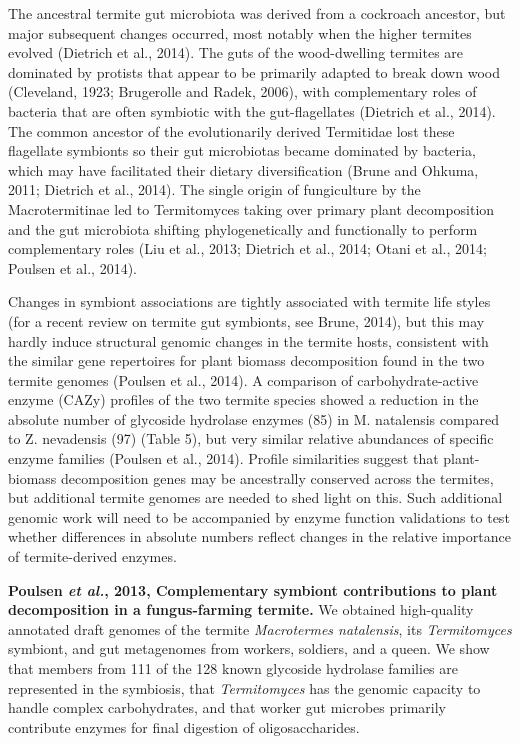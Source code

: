 \documentclass[11pt]{article}
\begin{document}
\begin{sloppypar}
\par
The ancestral termite gut microbiota was derived from a cockroach ancestor, but major subsequent changes occurred, most notably when the higher termites evolved (Dietrich et al., 2014). The guts of the wood-dwelling termites are dominated by protists that appear to be primarily adapted to break down wood (Cleveland, 1923; Brugerolle and Radek, 2006), with complementary roles of bacteria that are often symbiotic with the gut-flagellates (Dietrich et al., 2014). The common ancestor of the evolutionarily derived Termitidae lost these flagellate symbionts so their gut microbiotas became dominated by bacteria, which may have facilitated their dietary diversification (Brune and Ohkuma, 2011; Dietrich et al., 2014). The single origin of fungiculture by the Macrotermitinae led to Termitomyces taking over primary plant decomposition and the gut microbiota shifting phylogenetically and functionally to perform complementary roles (Liu et al., 2013; Dietrich et al., 2014; Otani et al., 2014; Poulsen et al., 2014).
\par
Changes in symbiont associations are tightly associated with termite life styles (for a recent review on termite gut symbionts, see Brune, 2014), but this may hardly induce structural genomic changes in the termite hosts, consistent with the similar gene repertoires for plant biomass decomposition found in the two termite genomes (Poulsen et al., 2014). A comparison of carbohydrate-active enzyme (CAZy) profiles of the two termite species showed a reduction in the absolute number of glycoside hydrolase enzymes (85) in M. natalensis compared to Z. nevadensis (97) (Table 5), but very similar relative abundances of specific enzyme families (Poulsen et al., 2014). Profile similarities suggest that plant-biomass decomposition genes may be ancestrally conserved across the termites, but additional termite genomes are needed to shed light on this. Such additional genomic work will need to be accompanied by enzyme function validations to test whether differences in absolute numbers reflect changes in the relative importance of termite-derived enzymes.
\par
\textbf{Poulsen \textit{et al.}, 2013, Complementary symbiont contributions to plant decomposition in a fungus-farming termite.} \newline
We obtained high-quality annotated draft genomes of the termite \textit{Macrotermes natalensis}, its \textit{Termitomyces} symbiont, and gut metagenomes from workers, soldiers, and a queen. 
We show that members from 111 of the 128 known glycoside hydrolase families are represented in the symbiosis, that \textit{Termitomyces} has the genomic capacity to handle complex carbohydrates, and that worker gut microbes primarily contribute enzymes for final digestion of oligosaccharides. 

\end{sloppypar}
\end{document}
